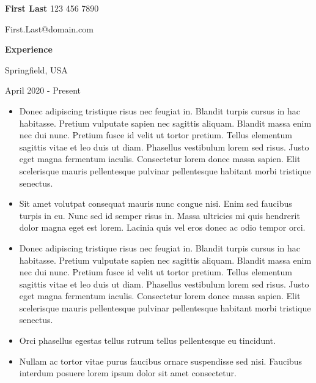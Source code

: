 \documentclass[letter,11pt]{article}
\begin{document}
\noindent \textbf {\huge First Last} \hfill 			{123 456 7890}

\hfill 			{First.Last@domain.com}


\noindent\textbf  {\large Experience} \vspace{2mm}

 \hfill Springfield, USA

  \hfill April 2020 - Present

\vspace{1mm}
\begin{itemize}[itemsep=0.05mm,topsep=0mm, label=\textrm{•}] 

	\item Donec adipiscing tristique risus nec feugiat in. Blandit turpis cursus in hac habitasse. Pretium vulputate sapien nec sagittis aliquam. Blandit massa enim nec dui nunc. Pretium fusce id velit ut tortor pretium. Tellus elementum sagittis vitae et leo duis ut diam. Phasellus vestibulum lorem sed risus. Justo eget magna fermentum iaculis. Consectetur lorem donec massa sapien. Elit scelerisque mauris pellentesque pulvinar pellentesque habitant morbi tristique senectus. 

	\item Sit amet volutpat consequat mauris nunc congue nisi. Enim sed faucibus turpis in eu. Nunc sed id semper risus in. Massa ultricies mi quis hendrerit dolor magna eget est lorem. Lacinia quis vel eros donec ac odio tempor orci. 
		
\end{itemize}
\vspace{1mm}
\begin{itemize}[itemsep=0.05mm,topsep=0mm, label=\textrm{•}]
		
	\item Donec adipiscing tristique risus nec feugiat in. Blandit turpis cursus in hac habitasse. Pretium vulputate sapien nec sagittis aliquam. Blandit massa enim nec dui nunc. Pretium fusce id velit ut tortor pretium. Tellus elementum sagittis vitae et leo duis ut diam. Phasellus vestibulum lorem sed risus. Justo eget magna fermentum iaculis. Consectetur lorem donec massa sapien. Elit scelerisque mauris pellentesque pulvinar pellentesque habitant morbi tristique senectus.

	\item Orci phasellus egestas tellus rutrum tellus pellentesque eu tincidunt. 

	\item Nullam ac tortor vitae purus faucibus ornare suspendisse sed nisi. Faucibus interdum posuere lorem ipsum dolor sit amet consectetur.
	
			

\end{itemize}
\vspace{1mm}
\end{document}
